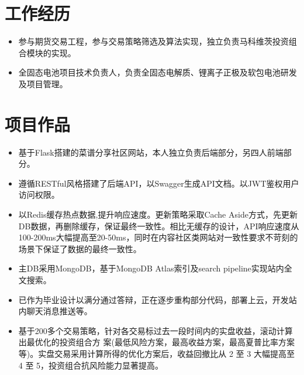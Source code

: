 \documentclass{resume}
\begin{document}

\section{工作经历}
\begin{itemize}
  \item 参与期货交易工程，参与交易策略筛选及算法实现，独立负责马科维茨投资组合模块的实现。
\end{itemize}

\begin{itemize}
  \item 全固态电池项目技术负责人，负责全固态电解质、锂离子正极及软包电池研发及项目管理。
\end{itemize}


\section{项目作品}

\begin{itemize}
  \item 基于Flask搭建的菜谱分享社区网站，本人独立负责后端部分，另四人前端部分。
  \item 遵循RESTful风格搭建了后端API，以Swagger生成API文档。以JWT鉴权用户访问权限。
  \item 以Redis缓存热点数据,提升响应速度。更新策略采取Cache Aside方式，先更新DB数据，再删除缓存，保证最终一致性。相比无缓存的设计，API响应速度从100-200ms大幅提高至20-50ms，同时在内容社区类网站对一致性要求不苛刻的场景下保证了数据的最终一致性。
  \item 主DB采用MongoDB，基于MongoDB Atlas索引及search pipeline实现站内全文搜索。
  \item 已作为毕业设计以满分通过答辩，正在逐步重构部分代码，部署上云，开发站内聊天消息推送等。

\end{itemize}

\begin{itemize}
  \item 基于200多个交易策略，针对各交易标过去一段时间内的实盘收益，滚动计算出最优化的投资组合方
  案(最低风险方案，最高收益方案，最高夏普比率方案等)。实盘交易采用计算所得的优化方案后，收益回撤比从 2 至 3 
  大幅提高至 4 至 5，投资组合抗风险能力显著提高。
\end{itemize}
\end{document}
